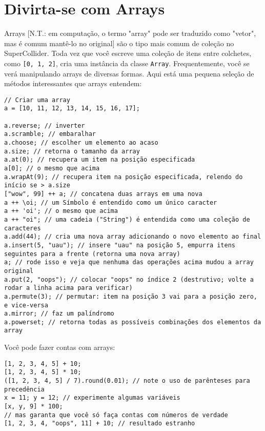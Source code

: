 \section{Divirta-se com Arrays}
\label{sec:arrays}

Arrays [N.T.: em computação, o termo "array" pode ser traduzido como "vetor", mas é comum mantê-lo no original] são o tipo mais comum de coleção no SuperCollider. Toda vez que você escreve uma coleção de itens entre colchetes, como \texttt{[0, 1, 2]}, cria uma instância da classe \texttt{Array}. Frequentemente, você se verá manipulando arrays de diversas formas. Aqui está uma pequena seleção de métodos interessantes que arrays entendem:

 
\begin{lstlisting}[style=SuperCollider-IDE, basicstyle=\scttfamily\footnotesize]
// Criar uma array
a = [10, 11, 12, 13, 14, 15, 16, 17];

a.reverse; // inverter
a.scramble; // embaralhar
a.choose; // escolher um elemento ao acaso
a.size; // retorna o tamanho da array
a.at(0); // recupera um item na posição especificada
a[0]; // o mesmo que acima
a.wrapAt(9); // recupera item na posição especificada, relendo do início se > a.size
["wow", 99] ++ a; // concatena duas arrays em uma nova
a ++ \oi; // um Símbolo é entendido como um único caracter
a ++ 'oi'; // o mesmo que acima
a ++ "oi"; // uma cadeia ("String") é entendida como uma coleção de caracteres
a.add(44); // cria uma nova array adicionando o novo elemento ao final
a.insert(5, "uau"); // insere "uau" na posição 5, empurra itens seguintes para a frente (retorna uma nova array)
a; // rode isso e veja que nenhuma das operações acima mudou a array original
a.put(2, "oops"); // colocar "oops" no índice 2 (destrutivo; volte a rodar a linha acima para verificar)
a.permute(3); // permutar: item na posição 3 vai para a posição zero, e vice-versa
a.mirror; // faz um palíndromo
a.powerset; // retorna todas as possíveis combinações dos elementos da array
\end{lstlisting}
 

Você pode fazer contas com arrays:

 
\begin{lstlisting}[style=SuperCollider-IDE, basicstyle=\scttfamily\footnotesize]
[1, 2, 3, 4, 5] + 10;
[1, 2, 3, 4, 5] * 10;
([1, 2, 3, 4, 5] / 7).round(0.01); // note o uso de parênteses para precedência
x = 11; y = 12; // experimente algumas variáveis
[x, y, 9] * 100;
// mas garanta que você só faça contas com números de verdade
[1, 2, 3, 4, "oops", 11] + 10; // resultado estranho
\end{lstlisting}
 

